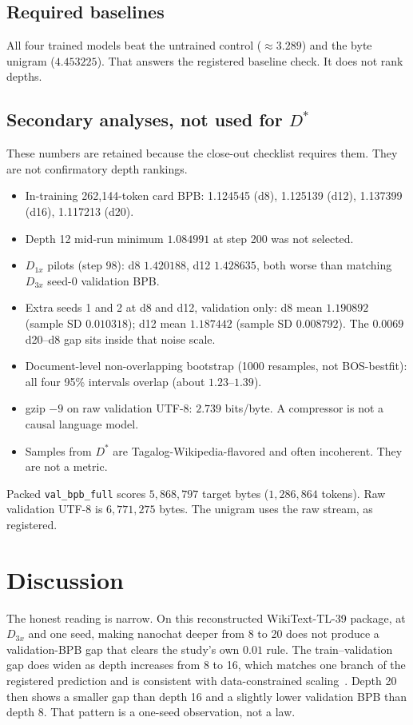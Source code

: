 \documentclass[11pt,a4paper]{article}
\begin{document}
\subsection{Required baselines}
All four trained models beat the untrained control ($\approx 3.289$) and the byte unigram ($4.453225$). That answers the registered baseline check. It does not rank depths.

\subsection{Secondary analyses, not used for $D^{\ast}$}
These numbers are retained because the close-out checklist requires them. They are not confirmatory depth rankings.

\begin{itemize}
\item In-training 262{,}144-token card BPB: 1.124545 (d8), 1.125139 (d12), 1.137399 (d16), 1.117213 (d20).
\item Depth 12 mid-run minimum $1.084991$ at step 200 was not selected.
\item $D_{1x}$ pilots (step 98): d8 $1.420188$, d12 $1.428635$, both worse than matching $D_{3x}$ seed-0 validation BPB.
\item Extra seeds 1 and 2 at d8 and d12, validation only: d8 mean $1.190892$ (sample SD $0.010318$); d12 mean $1.187442$ (sample SD $0.008792$). The $0.0069$ d20--d8 gap sits inside that noise scale.
\item Document-level non-overlapping bootstrap (1000 resamples, not BOS-bestfit): all four 95\% intervals overlap (about $1.23$--$1.39$).
\item gzip $-9$ on raw validation UTF-8: $2.739$ bits/byte. A compressor is not a causal language model.
\item Samples from $D^{\ast}$ are Tagalog-Wikipedia-flavored and often incoherent. They are not a metric.
\end{itemize}

Packed \texttt{val\_bpb\_full} scores $5{,}868{,}797$ target bytes ($1{,}286{,}864$ tokens). Raw validation UTF-8 is $6{,}771{,}275$ bytes. The unigram uses the raw stream, as registered.

\section{Discussion}
\label{sec:discussion}

The honest reading is narrow. On this reconstructed WikiText-TL-39 package, at $D_{3x}$ and one seed, making nanochat deeper from 8 to 20 does not produce a validation-BPB gap that clears the study's own $0.01$ rule. The train--validation gap does widen as depth increases from 8 to 16, which matches one branch of the registered prediction and is consistent with data-constrained scaling~\cite{hoffmann2022chinchilla,muennighoff2023dataconstrained}. Depth 20 then shows a smaller gap than depth 16 and a slightly lower validation BPB than depth 8. That pattern is a one-seed observation, not a law.
\end{document}
